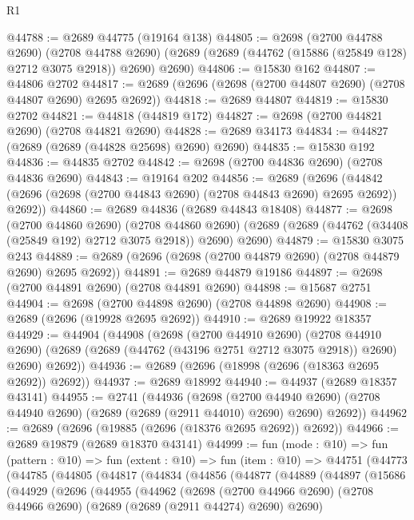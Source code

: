 \begin{lexlean}{R1}
\begin{coremodule}
@44788 := @2689 @44775 (@19164 @138)
@44805 := @2698
    (@2700 @44788 @2690)
    (@2708 @44788 @2690)
    (@2689 (@2689 (@44762 (@15886 (@25849 @128) @2712 @3075 @2918)) @2690) @2690)
@44806 := @15830 @162
@44807 := @44806 @2702
@44817 := @2689 (@2696 (@2698 (@2700 @44807 @2690) (@2708 @44807 @2690) @2695 @2692))
@44818 := @2689 @44807
@44819 := @15830 @2702
@44821 := @44818 (@44819 @172)
@44827 := @2698 (@2700 @44821 @2690) (@2708 @44821 @2690)
@44828 := @2689 @34173
@44834 := @44827 (@2689 (@2689 (@44828 @25698) @2690) @2690)
@44835 := @15830 @192
@44836 := @44835 @2702
@44842 := @2698 (@2700 @44836 @2690) (@2708 @44836 @2690)
@44843 := @19164 @202
@44856 := @2689
    (@2696 (@44842 (@2696 (@2698 (@2700 @44843 @2690) (@2708 @44843 @2690) @2695 @2692)) @2692))
@44860 := @2689 @44836 (@2689 @44843 @18408)
@44877 := @2698
    (@2700 @44860 @2690)
    (@2708 @44860 @2690)
    (@2689 (@2689 (@44762 (@34408 (@25849 @192) @2712 @3075 @2918)) @2690) @2690)
@44879 := @15830 @3075 @243
@44889 := @2689 (@2696 (@2698 (@2700 @44879 @2690) (@2708 @44879 @2690) @2695 @2692))
@44891 := @2689 @44879 @19186
@44897 := @2698 (@2700 @44891 @2690) (@2708 @44891 @2690)
@44898 := @15687 @2751
@44904 := @2698 (@2700 @44898 @2690) (@2708 @44898 @2690)
@44908 := @2689 (@2696 (@19928 @2695 @2692))
@44910 := @2689 @19922 @18357
@44929 := @44904
    (@44908
      (@2698
        (@2700 @44910 @2690)
        (@2708 @44910 @2690)
        (@2689 (@2689 (@44762 (@43196 @2751 @2712 @3075 @2918)) @2690) @2690)
        @2692))
@44936 := @2689 (@2696 (@18998 (@2696 (@18363 @2695 @2692)) @2692))
@44937 := @2689 @18992
@44940 := @44937 (@2689 @18357 @43141)
@44955 := @2741
    (@44936
      (@2698
        (@2700 @44940 @2690)
        (@2708 @44940 @2690)
        (@2689 (@2689 (@2911 @44010) @2690) @2690)
        @2692))
@44962 := @2689 (@2696 (@19885 (@2696 (@18376 @2695 @2692)) @2692))
@44966 := @2689 @19879 (@2689 @18370 @43141)
@44999 := fun (mode : @10) =>
  fun (pattern : @10) =>
  fun (extent : @10) =>
  fun (item : @10) =>
  @44751
    (@44773
      (@44785
        (@44805
          (@44817
            (@44834
              (@44856
                (@44877
                  (@44889
                    (@44897
                      (@15686
                        (@44929
                          (@2696
                            (@44955
                              (@44962
                                (@2698
                                  (@2700 @44966 @2690)
                                  (@2708 @44966 @2690)
                                  (@2689 (@2689 (@2911 @44274) @2690) @2690)

\end{coremodule}
\end{lexlean}
